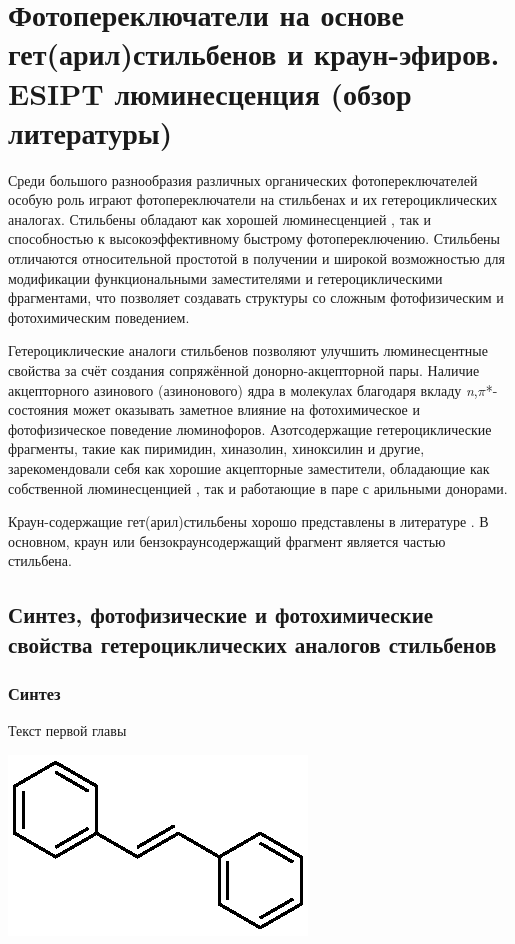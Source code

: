 \chapter{Фотопереключатели на основе гет(арил)стильбенов и краун-эфиров. ESIPT люминесценция (обзор литературы)} \label{chapt1}

	Среди большого разнообразия различных органических фотопереключателей особую роль играют фотопереключатели на стильбенах и их гетероциклических аналогах. Стильбены обладают как хорошей люминесценцией \cite{Krasovitsky_Bolotin}, так и способностью к высокоэффективному быстрому фотопереключению. Стильбены отличаются относительной простотой в получении \cite{Wood1941} и широкой возможностью для модификации функциональными заместителями и гетероциклическими фрагментами, что позволяет создавать структуры со сложным фотофизическим и фотохимическим поведением. \cite{Waldeck_D_H1991_Stilbenes} 
	
	Гетероциклические аналоги стильбенов позволяют улучшить люминесцентные свойства за счёт создания сопряжённой донорно-акцепторной пары. Наличие акцепторного азинового (азинонового) ядра в молекулах благодаря вкладу \textit{n},$\pi$*-состояния может оказывать заметное влияние на фотохимическое и фотофизическое поведение люминофоров. \cite{Lower1966} Азотсодержащие гетероциклические фрагменты, такие как пиримидин, хиназолин, хиноксилин и другие, зарекомендовали себя как хорошие акцепторные заместители, обладающие как собственной люминесценцией \cite{Krasovitsky_Bolotin}, так и работающие в паре с арильными донорами.
	
	Краун-содержащие гет(арил)стильбены хорошо представлены в литературе \cite{Gromov_2006_Crowns_in_Stilbenes}. В основном, краун или бензокраунсодержащий фрагмент является частью стильбена. 

	\section{Синтез, фотофизические и фотохимические свойства гетероциклических аналогов стильбенов}\label{sect1_1}
	
		\subsection{Синтез}
	
			Текст первой главы
			
			\begin{scheme}
				\label{sch1}
				\includegraphics{Dissertation/images/part1/Stilbene}
			\end{scheme}
		
